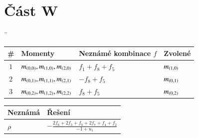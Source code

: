\newpage
\section*{Část W}
¨
\begin{table}[!h]
	\centering
	\begin{tabular}{c l l l}
		\toprule
		\# & Momenty & Neznámé kombinace $f$ & Zvolené\\
		\midrule
		\multirow{ 1}{*}{$1$} & \multirow{ 1}{*}{$m_{\left(0,0\right)}, m_{\left(1,0\right)}, m_{\left(2,0\right)}$} & $f_1+f_8+f_5$ & \multirow{ 1}{*}{$m_{\left(1,0\right)}$}\\ 
		\midrule
		\multirow{ 1}{*}{$2$} & \multirow{ 1}{*}{$m_{\left(0,1\right)}, m_{\left(1,1\right)}, m_{\left(2,1\right)}$} & $-f_8+f_5$ & \multirow{ 1}{*}{$m_{\left(0,1\right)}$}\\ 
		\midrule
		\multirow{ 1}{*}{$3$} & \multirow{ 1}{*}{$m_{\left(0,2\right)}, m_{\left(1,2\right)}, m_{\left(2,2\right)}$} & $f_8+f_5$ & \multirow{ 1}{*}{$m_{\left(0,2\right)}$}\\ 
		\bottomrule
\end{tabular}\end{table}

\begin{table}[!h]
	\centering
	\begin{tabular}{l l}
		\toprule
		Neznámá & Řešení\\
		\midrule
		$\rho$ & $-\frac{2 f_6+2 f_3+f_0+2 f_7+f_4+f_2}{-1+u_1}$ \\ 
		\bottomrule
\end{tabular}\end{table}

